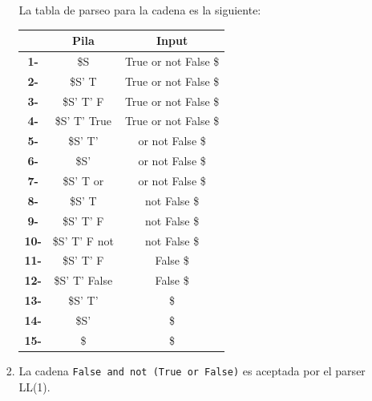 \documentclass[12pt, letterpaper]{article}
\begin{document}
\begin{enumerate}
\begin{enumerate}[label=(\alph*)]
\begin{enumerate}[label=(\alph*)]
    La tabla de parseo para la cadena es la siguiente:
    \begin{table}[H]
      \centering
      \begin{tabular}{|c|c|c|}
        \hline
        & \textbf{Pila} & \textbf{Input}       \\ \hline
        \textbf{1-}  & \$S           & True or not False \$ \\ \hline
        \textbf{2-}  & \$S' T        & True or not False \$ \\ \hline
        \textbf{3-}  & \$S' T' F     & True or not False \$ \\ \hline
        \textbf{4-}  & \$S' T' True  & True or not False \$ \\ \hline
        \textbf{5-}  & \$S' T'       & or not False \$      \\ \hline
        \textbf{6-}  & \$S'          & or not False \$      \\ \hline
        \textbf{7-}  & \$S' T or     & or not False \$      \\ \hline
        \textbf{8-}  & \$S' T        & not False \$         \\ \hline
        \textbf{9-}  & \$S' T' F     & not False \$         \\ \hline
        \textbf{10-} & \$S' T' F not & not False \$         \\ \hline
        \textbf{11-} & \$S' T' F     & False \$             \\ \hline
        \textbf{12-} & \$S' T' False & False \$             \\ \hline
        \textbf{13-} & \$S' T'       & \$                   \\ \hline
        \textbf{14-} & \$S'          & \$                   \\ \hline
        \textbf{15-} & \$            & \$                   \\ \hline
      \end{tabular}
    \end{table}
  \item La cadena \texttt{False and not (True or False)} es aceptada por el parser LL(1).
    

\end{enumerate}
\end{enumerate}
\end{enumerate}
\end{document}
